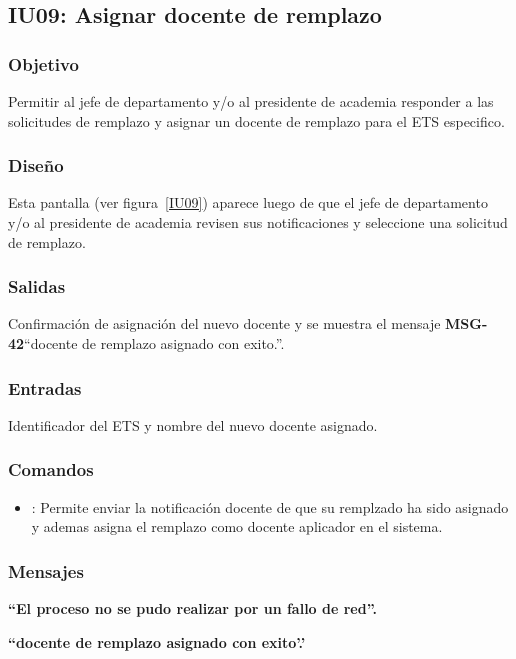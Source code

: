 \subsection{IU09: Asignar docente de remplazo}

\subsubsection{Objetivo}
Permitir al jefe de departamento y/o al presidente de academia responder a las solicitudes de remplazo y asignar un docente de remplazo para el ETS especifico.

\subsubsection{Diseño}
Esta pantalla  (ver figura~\ref{IU09}) aparece luego de que el jefe de departamento y/o al presidente de academia revisen sus notificaciones y seleccione una solicitud de remplazo.


\subsubsection{Salidas}
Confirmación de asignación del nuevo docente y se muestra el mensaje {\bf MSG-42}{``docente de remplazo asignado con exito.''}.

\subsubsection{Entradas}
Identificador del ETS y nombre del nuevo docente asignado.

\subsubsection{Comandos}
\begin{itemize}
	\item {}: Permite enviar la notificación docente de que su remplzado ha sido asignado y ademas asigna el remplazo como docente aplicador en el sistema.
\end{itemize}

\subsubsection{Mensajes}

\begin{Citemize}
	\item {\bf ``El proceso no se pudo realizar por un fallo de red''.}
	\item {\bf ``docente de remplazo asignado con exito'.'}
\end{Citemize}


